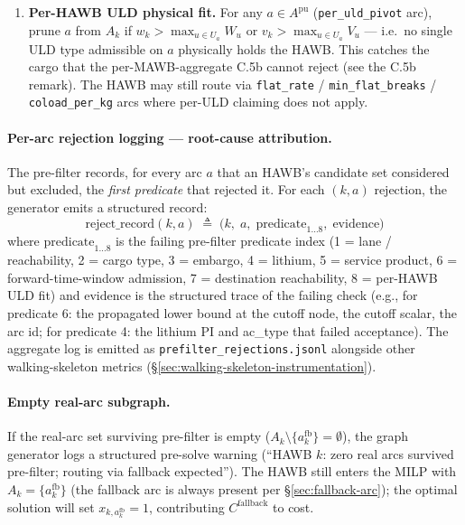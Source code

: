 \documentclass[11pt,a4paper]{article}
\newcommand{\defeq}{\triangleq}
\theoremstyle{definition}
\begin{document}
\begin{enumerate}[noitemsep]
        preceding ground arc); (ii) if $a$ is an air arc, set its head window
        $t^{\text{lo}}_{n_2} = t^{\text{hi}}_{n_2} = \text{ETA}_a$;
        (iii) otherwise propagate the window forward. Additionally retain $a$
        only if a forward path from $n_2$ to $D_k^{\text{node}}$ exists with
        cumulative arrival $\leq T_k^{\text{abs}}$ (otherwise $a$ is dominated
        by the fallback on both cost and arrival). The fallback arc is exempt
        from this and every other pre-filter predicate.
  \item \textbf{Per-HAWB ULD physical fit.} For any $a \in A^{\text{pu}}$
        (\texttt{per\_uld\_pivot} arc), prune $a$ from $A_k$ if
        $w_k > \max_{u \in U_a} W_u$ or $v_k > \max_{u \in U_a} V_u$ ---
        i.e.\ no single ULD type admissible on $a$ physically holds the HAWB.
        This catches the cargo that the per-MAWB-aggregate C.5b cannot reject
        (see the C.5b remark). The HAWB may still route via
        \texttt{flat\_rate} / \texttt{min\_flat\_breaks} / \texttt{coload\_per\_kg}
        arcs where per-ULD claiming does not apply.
\end{enumerate}

\paragraph{Per-arc rejection logging --- root-cause attribution.}
The pre-filter records, for every arc $a$ that an HAWB's candidate set
considered but excluded, the \emph{first predicate} that rejected it.
For each $(k, a)$ rejection, the generator emits a structured record:
\begin{equation*}
  \text{reject\_record}(k, a) \;\defeq\; \bigl(k,\; a,\;
    \text{predicate}_{1\ldots 8},\; \text{evidence}\bigr)
\end{equation*}
where $\text{predicate}_{1\ldots 8}$ is the failing pre-filter predicate
index (1 = lane / reachability, 2 = cargo type, 3 = embargo, 4 =
lithium, 5 = service product, 6 = forward-time-window admission, 7 =
destination reachability, 8 = per-HAWB ULD fit) and $\text{evidence}$
is the structured trace of the failing check (e.g., for predicate 6:
the propagated lower bound at the cutoff node, the cutoff scalar, the
arc id; for predicate 4: the lithium PI and ac\_type that failed
acceptance). The aggregate log is emitted as
\texttt{prefilter\_rejections.jsonl} alongside other walking-skeleton
metrics (\S\ref{sec:walking-skeleton-instrumentation}).

\paragraph{Empty real-arc subgraph.}
If the real-arc set surviving pre-filter is empty ($A_k \setminus
\{a^{\text{fb}}_k\} = \emptyset$), the graph generator logs a structured
pre-solve warning (``HAWB $k$: zero real arcs survived pre-filter; routing
via fallback expected''). The HAWB still enters the MILP with $A_k =
\{a^{\text{fb}}_k\}$ (the fallback arc is always present per
\S\ref{sec:fallback-arc}); the optimal solution will set $x_{k,
a^{\text{fb}}_k} = 1$, contributing $C^{\text{fallback}}$ to cost.
\end{document}
